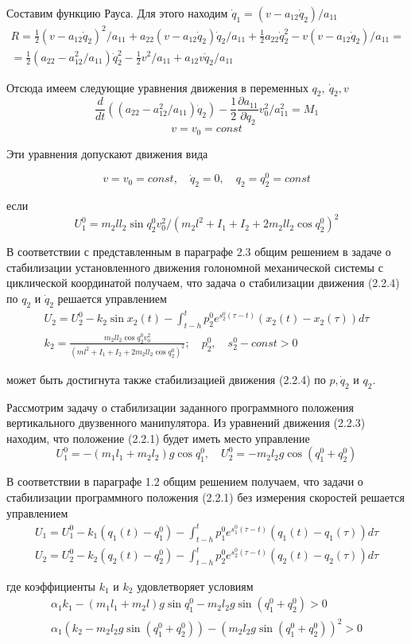 Составим функцию Рауса. Для этого находим $\dot q_1 = (v - a_12 \dot q_2) / a_{11}$
$$
\begin{array}{c}
\displaystyle R = \frac12 (v - a_{12} \dot q_2)^2 / a_{11} + a_{22} (v - a_{12} \dot q_2) \dot q_2 / a_{11} + \frac12 a_{22} \dot q_2^2 - v (v - a_{12} \dot q_2) / a_{11} =\\
\displaystyle = \frac12 (a_{22} - a_{12}^2 / a_{11}) \dot q_2^2 - \frac12 v^2 / a_{11} + a_{12} v \dot q_2 / a_{11}
\end{array}
$$

Отсюда имеем следующие уравнения движения в переменных $q_2, \ \dot q_2, v$
$$\frac{d}{dt} ((a_{22} - a_{12}^2 / a_{11}) \dot q_2) - \frac12 \frac{\partial a_{11}}{\partial q_2} v_0^2 / a_{11}^2 = M_1$$
$$v = v_0 = const$$

Эти уравнения допускают движения вида 

\begin{equation}
v = v_0 = const, \quad \dot q_2 = 0, \quad q_2 = q_2^0 = const
\end{equation}

если 
$$U_1^0 = m_2 l l_2 \sin q_2^0 v_0^2 / (m_2 l^2 + I_1 + I_2 + 2 m_2 l l_2 \cos q_2^0)^2$$

В соответствии с представленным в параграфе 2.3 общим решением в задаче о стабилизации установленного движения голономной механической системы с циклической координатой получаем, что задача о стабилизации движения (2.2.4) по $q_2$ и $\dot q_2$ решается управлением
$$
\begin{array}{c}
\displaystyle U_2 = U_2^0 - k_2 \sin x_2 (t) - \int_{t-h}^{t} p_2^0 e^{s_2^0 (\tau - t)} (x_2 (t) - x_2 (\tau)) d \tau\\
\displaystyle k_2 = \frac{m_2 l l_2 \cos q_2^0 v_0^2}{(m l^2 + I_1 + I_2 + 2 m_2 l l_2 \cos q_2^0)^2}; \quad p_2^0, \quad s_2^0 - const > 0
\end{array}
$$

может быть достигнута также стабилизацией движения (2.2.4) по $p, \dot q_2$ и $q_2.$

Рассмотрим задачу о стабилизации заданного программного положения вертикального двузвенного манипулятора. Из уравнений движения (2.2.3) находим, что положение (2.2.1) будет иметь место управление $$U_1^0 = -(m_1 l_1 + m_2 l_2) g \cos q_1^0, \quad U_2^0 = -m_2 l_2 g \cos (q_1^0 + q_2^0)$$

В соответствии в параграфе 1.2 общим решением получаем, что задачи о стабилизации программного положения (2.2.1) без измерения скоростей решается управлением 
$$
\begin{array}{l}
\displaystyle U_1 = U_1^0 - k_1 (q_1(t) - q_1^0) - \int_{t-h}^{t} p_1^0 e^{s_1^0 (\tau - t)} (q_1(t) - q_1(\tau)) d \tau\\
\displaystyle U_2 = U_2^0 - k_2 (q_2(t) - q_2^0) - \int_{t-h}^{t} p_2^0 e^{s_2^0 (\tau - t)} (q_2(t) - q_2(\tau)) d \tau
\end{array}
$$

где коэффициенты $k_1$ и $k_2$ удовлетворяет условиям 
$$
\begin{array}{c}
\alpha_1 k_1 - (m_1 l_1 + m_2 l) g \sin q_1^0 - m_2 l_2 g \sin (q_1^0 + q_2^0) > 0\\
\alpha_1 (k_2 - m_2 l_2 g \sin (q_1^0 + q_2^0)) - (m_2 l_2 g \sin (q_1^0 + q_2^0))^2 > 0
\end{array}
$$